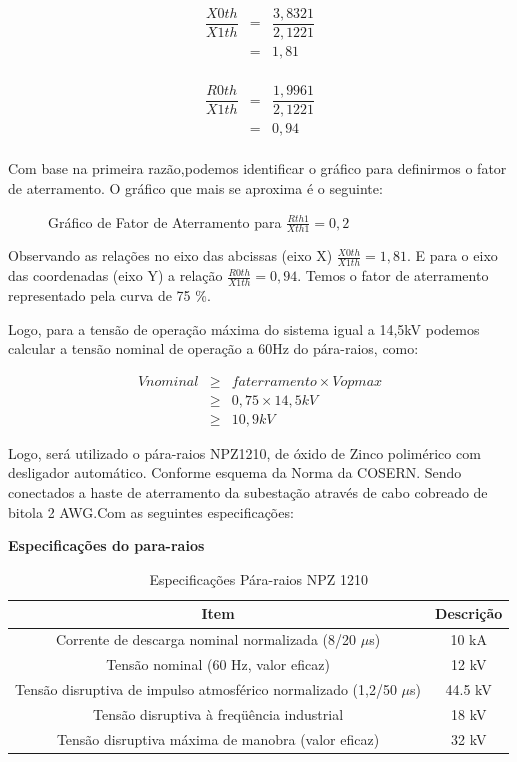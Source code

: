 \begin{eqnarray*}
\dfrac{X0th}{X1th} &=&  \dfrac{3,8321}{2,1221}\\
	    &=&1,81\\				
\end{eqnarray*} 

\begin{eqnarray*}
\dfrac{R0th}{X1th} &=&  \dfrac{1,9961}{2,1221}\\
	    &=&0,94\\				
\end{eqnarray*} 


Com base na primeira razão,podemos identificar o gráfico para definirmos o fator de aterramento. O gráfico que mais se aproxima é o seguinte:


\begin{figure}[h]
\centering
\caption{Gráfico de Fator de Aterramento para $\frac{Rth1}{Xth1} = 0,2$}
\end{figure}  

Observando as relações no eixo das abcissas (eixo X) $\frac{X0th}{X1th}=1,81$. E para o eixo das coordenadas (eixo Y) a relação $\frac{R0th}{X1th} =0,94 $. Temos o fator de aterramento representado pela curva de 75 \%.  

Logo, para a tensão de operação máxima do sistema igual a 14,5kV podemos calcular a tensão nominal de operação a 60Hz do pára-raios, como:

\begin{eqnarray*}
Vnominal &\geq&  faterramento \times Vopmax\\
	    &\geq& 0,75 \times 14,5kV\\
	    &\geq& 10,9kV				
\end{eqnarray*} 

Logo, será utilizado o pára-raios NPZ1210,  de óxido de Zinco polimérico com desligador automático. Conforme esquema da Norma da COSERN. Sendo conectados a haste de aterramento da subestação através de cabo cobreado de bitola 2 AWG.Com as seguintes especificações:

\begin{center}
\textbf{Especificações do para-raios}\\
\end{center} 

	
	\begin{table}[H]
	\centering
	\begin{tabular}{cc}
	\toprule
	\multicolumn{1}{c}{\textbf{Item}} & \multicolumn{1}{c}{\textbf{Descrição}} \\
	\midrule
		Corrente de descarga nominal normalizada (8/20 $\mu$s) & 10 kA\\ 
		Tensão nominal (60 Hz, valor eficaz) & 12 kV \\
		Tensão disruptiva de impulso atmosférico normalizado (1,2/50 $\mu$s) & 44.5 kV \\
		Tensão disruptiva à freqüência industrial & 18 kV \\
		Tensão disruptiva máxima de manobra (valor eficaz) & 32 kV\\
	\bottomrule
	\end{tabular}
	\caption{Especificações Pára-raios NPZ 1210}
	\end{table}
	
